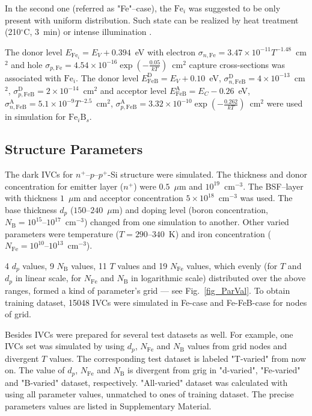 \documentclass[journal]{IEEEtran}
\begin{document}
In the second one (referred as "Fe"--case), the $\mathrm{Fe}_i$ was suggested to be only present  with uniform distribution.
Such state can be realized by heat treatment (210$^\circ$C, 3~min) \cite{FeB_Zong} or intense illumination \cite{FeBLight2}.

The donor level $E_{\mathrm{Fe}_i} = E_V+0.394$~eV
with electron $\sigma_{n,{\mathrm{Fe}}}=3.47\times10^{-11}T^{-1.48}$~cm$^2$ and
hole $\sigma_{p,{\mathrm{Fe}}}=4.54\times10^{-16}\exp\left(-\frac{0.05}{kT}\right)$~cm$^2$ capture cross-sections \cite{MurphyJAP2011,ROUGIEUX2018}
was associated with $\mathrm{Fe}_i$.
The donor level $E_{\mathrm{FeB}}^\mathrm{D}= E_V+0.10$~eV,
$\sigma_{n,{\mathrm{FeB}}}^\mathrm{D}=4\times10^{-13}$~cm$^2$,
$\sigma_{p,{\mathrm{FeB}}}^\mathrm{D}=2\times10^{-14}$~cm$^2$
and acceptor level $E_{\mathrm{FeB}}^\mathrm{A}= E_C-0.26$~eV,
$\sigma_{n,{\mathrm{FeB}}}^\mathrm{A}=5.1\times10^{-9}T^{-2.5}$~cm$^2$,
$\sigma_{p,{\mathrm{FeB}}}^\mathrm{A}=3.32\times10^{-10}\exp\left(-\frac{0.262}{kT}\right)$~cm$^2$
\cite{Istratov1999,MurphyJAP2011,ROUGIEUX2018}
were used in simulation for $\mathrm{Fe}_i\mathrm{B}_s$.

\subsection{Structure Parameters}

The dark IVCs for $n^+$--$p$--$p^+$-Si structure were simulated.
The thickness and donor concentration for emitter layer ($n^+$) were $0.5$~$\mu$m and $10^{19}$~cm$^{-3}$.
The BSF--layer with thickness  $1$~$\mu$m and acceptor concentration $5\times10^{18}$~cm$^{-3}$ was used.
The base thickness $d_p$ ($150$--$240$~$\mu$m) and doping level (boron concentration, $N_\mathrm{B}=10^{15}$--$10^{17}$~cm$^{-3}$) changed from one simulation to another.
Other varied parameters were temperature ($T=290$--$340$~K) and iron concentration ($N_{\mathrm{Fe}}=10^{10}$--$10^{13}$~cm$^{-3}$).


4 $d_p$ values, 9 $N_\mathrm{B}$ values, 11 $T$ values and 19 $N_{\mathrm{Fe}}$ values, which
evenly
(for $T$ and $d_p$ in linear scale, for $N_{\mathrm{Fe}}$ and $N_\mathrm{B}$ in logarithmic scale)
distributed over the above ranges,
 formed a kind of parameter's grid --- see Fig.~\ref{fig_ParVal}.
To obtain training dataset, 15048 IVCs were simulated in Fe-case and Fe-FeB-case for nodes of grid.

Besides IVCs were prepared for several test datasets as well.
For example, one IVCs set was simulated by using $d_p$, $N_{\mathrm{Fe}}$ and $N_\mathrm{B}$ values
from grid nodes and divergent $T$ values.
The corresponding test dataset is labeled "T-varied" from now on.
The value of $d_p$, $N_{\mathrm{Fe}}$ and $N_\mathrm{B}$ is divergent from  grig in "d-varied",
"Fe-varied" and "B-varied" dataset, respectively.
"All-varied" dataset was calculated with using all parameter values, unmatched to ones of training dataset.
The precise parameters values are listed in  Supplementary Material.
\end{document}
